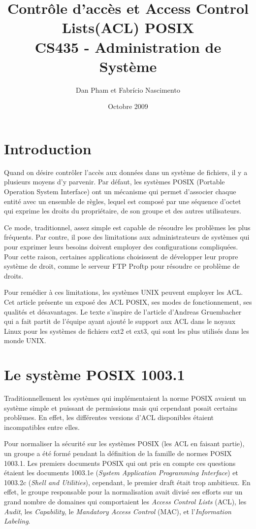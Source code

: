 \documentclass{article}
\title{\textbf{Contrôle d'accès et Access Control Lists(ACL) POSIX } \\ CS435 - Administration de Système }
\author{Dan Pham et Fabrício Nascimento}
\date{Octobre 2009}
\begin{document}
\maketitle
\newpage

\tableofcontents
\newpage

\section{Introduction}
Quand on désire contrôler l'accès aux données dans un système de fichiers, il y a plusieurs moyens d’y parvenir. Par défaut, les systèmes POSIX (Portable Operation System Interface)\cite{ieee1,ieee2} ont un mécanisme qui permet d’associer chaque entité avec un ensemble de règles, lequel est composé par une séquence d'octet qui exprime les droits du propriétaire, de son groupe et des autres utilisateurs.

Ce mode, traditionnel, assez simple est capable de résoudre les problèmes les plus fréquents. Par contre, il pose des limitations aux administrateurs de systèmes qui pour exprimer leurs besoins doivent employer des configurations compliquées. Pour cette raison, certaines applications choisissent de développer leur propre système de droit, comme le serveur FTP Proftp\cite{ftp} pour résoudre ce problème de droits.

Pour remédier à ces limitations, les systèmes UNIX peuvent employer les ACL. Cet article présente un exposé des ACL POSIX, ses modes de fonctionnement, ses qualités et désavantages. Le texte s’inspire de l'article d’Andreas Gruembacher\cite{aclsuse} qui a fait partit de l’équipe ayant ajouté le support aux ACL dans le noyaux Linux pour les systèmes de fichiers ext2 et ext3, qui sont les plus utilisés dans les monde UNIX.

\section{Le système POSIX 1003.1}
 
Traditionnellement les systèmes qui implémentaient la norme POSIX avaient un système simple et puissant de permissions mais qui cependant posait certains problèmes. En effet, les différentes versions d'ACL disponibles étaient incompatibles entre elles.
 
Pour normaliser la sécurité sur les systèmes POSIX (les ACL en faisant partie), un groupe a été formé pendant la définition de la famille de normes POSIX 1003.1. Les premiers documents POSIX qui ont pris en compte ces questions étaient les documents 1003.1e (\emph{System Application Programming Interface}) et 1003.2c (\emph{Shell and Utilities}), cependant, le premier draft était trop ambitieux. En effet, le groupe responsable pour la normalisation avait divisé ses efforts sur un grand nombre de domaines qui comportaient les \emph{Access Control Lists} (ACL), les \emph{Audit}, les \emph{Capability}, le \emph{ Mandatory Access Control }(MAC), et l'\emph{Information Labeling}\cite{aclsuse}.
 
\end{document}
